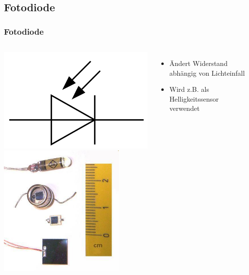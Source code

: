 \subsection*{Fotodiode}
\begin{frame}
    \frametitle{Fotodiode}
    \begin{columns}[c]
        \begin{center}
            \includegraphics[width=1\textwidth,height=.3\textheight,keepaspectratio]{a05/Symbol_Photodiode.png}\\
            \includegraphics[width=0.8\textwidth,height=.55\textheight,keepaspectratio]{a05/Fotodio.jpg}
            \tiny \hyperlink{refs}{\cite{wm}}
        \end{center}
    \begin{itemize}
			\item Ändert Widerstand abhängig von Lichteinfall 
			\item Wird z.B. als Helligkeitssensor verwendet
    \end{itemize}
    \end{columns}
\end{frame}

